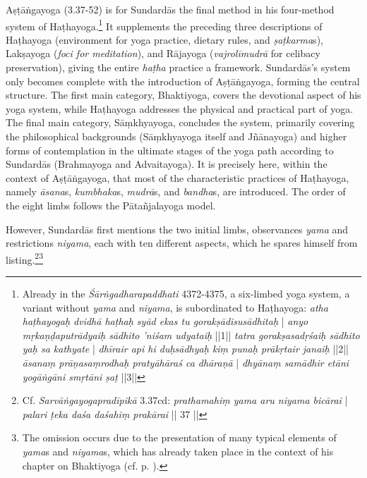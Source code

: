 Aṣṭāṅgayoga (3.37-52) is for Sundardās the final method in his four-method system of Haṭhayoga.\footnote{Already in the \emph{Śārṅgadharapaddhati} 4372-4375, a six-limbed yoga system, a variant without \textit{yama} and \textit{niyama}, is subordinated to Haṭhayoga: \textit{atha haṭhayogaḥ dvidhā haṭhaḥ syād ekas tu gorakṣādisusādhitaḥ} | \textit{anyo mṛkaṇḍaputrādyaiḥ sādhito 'niśam udyataiḥ} ||1|| \textit{tatra gorakṣasadṛśaiḥ sādhito yaḥ sa kathyate} | \textit{dhīrair api hi duḥsādhyaḥ kiṃ punaḥ prākṛtair janaiḥ} ||2|| \textit{āsanaṃ prāṇasaṃrodhaḥ pratyāhāraś ca dhāraṇā} | \textit{dhyānaṃ samādhir etāni yogāṅgāni smṛtāni ṣaṭ} ||3||} It supplements the preceding three descriptions of Haṭhayoga (environment for yoga practice, dietary rules, and \textit{ṣaṭkarma}s), Lakṣayoga (\textit{foci for meditation}), and Rājayoga (\textit{vajrolīmudrā} for celibacy preservation), giving the entire \textit{haṭha} practice a framework. Sundardās's system only becomes complete with the introduction of Aṣṭāṅgayoga, forming the central structure. The first main category, Bhaktiyoga, covers the devotional aspect of his yoga system, while Haṭhayoga addresses the physical and practical part of yoga. The final main category, Sāṃkhyayoga, concludes the system, primarily covering the philosophical backgrounds (Sāṃkhyayoga itself and Jñānayoga) and higher forms of contemplation in the ultimate stages of the yoga path according to Sundardās (Brahmayoga and Advaitayoga). It is precisely here, within the context of Aṣṭāṅgayoga, that most of the characteristic practices of Haṭhayoga, namely \textit{āsana}s, \textit{kumbhaka}s, \textit{mudrā}s, and \textit{bandha}s, are introduced. The order of the eight limbs follows the Pātañjalayoga model.

However, Sundardās first mentions the two initial limbs, observances \textit{yama} and restrictions \textit{niyama}, each with ten different aspects, which he spares himself from listing.\footnote{Cf. \textit{Sarvāṅgayogapradīpikā} 3.37cd: \textit{prathamahiṃ yama aru niyama bicārai} | \textit{palari ṭeka daśa daśahiṃ prakārai} || 37 ||}\footnote{The omission occurs due to the presentation of many typical elements of \textit{yama}s and \textit{niyama}s, which has already taken place in the context of his chapter on Bhaktiyoga (cf. p. \pageref{sarvangabhakti}).}

